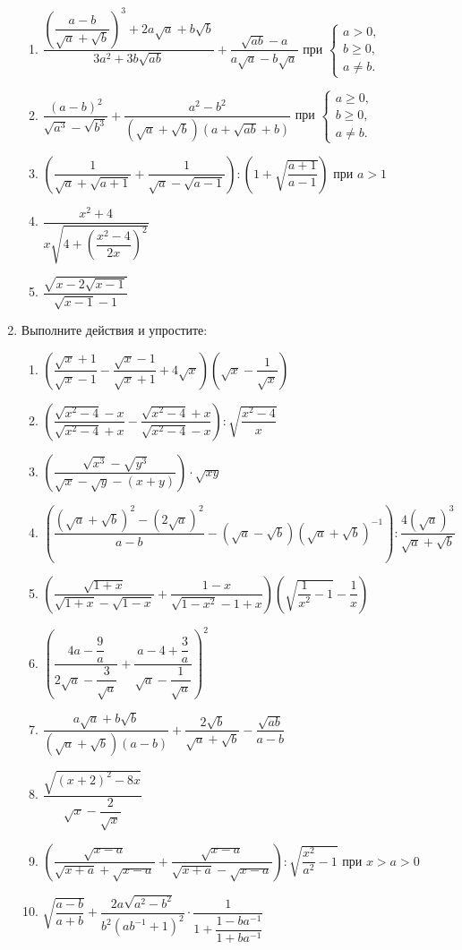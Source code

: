 \documentclass[12pt, a4paper]{article}
\begin{document}
\begin{enumerate}
\begin{enumerate}[label=\textbf{\arabic*)}]
		\item \( \dfrac{\left( \dfrac{a-b}{\sqrt{a}+\sqrt{b}} \right)^3+2a\sqrt{a}+b\sqrt{b}}{3a^2+3b\sqrt{ab}}+\dfrac{\sqrt{ab}-a}{a\sqrt{a}-b\sqrt{a}} \) при
		\( \left\{
		\begin{array}{l}
			a>0,\\
			b \geqslant0,\\
			a \neq b.
		\end{array}
		\right. \)
		\item \( \dfrac{(a-b)^2}{\sqrt{a^3}-\sqrt{b^3}}+\dfrac{a^2-b^2}{(\sqrt{a}+\sqrt{b})(a+\sqrt{ab}+b)} \) при
		\( \left\{
		\begin{array}{l}
			a\geqslant0,\\
			b \geqslant0,\\
			a \neq b.
		\end{array}
		\right. \)
		\item \( \left( \dfrac{1}{\sqrt{a}+\sqrt{a+1}}+\dfrac{1}{\sqrt{a}-\sqrt{a-1}} \right):\left( 1+\sqrt{\dfrac{a+1}{a-1}} \right) \) при \( a>1 \)
		\item \( \dfrac{x^2+4}{x\sqrt{4+\left( \dfrac{x^2-4}{2x} \right)^2}} \)
		\item \( \dfrac{\sqrt{x-2\sqrt{x-1}}}{\sqrt{x-1}-1} \)
		\end{enumerate}
	\item Выполните действия и упростите:
		\begin{enumerate}[label=\textbf{\arabic*)}]
			\item \( \left( \dfrac{\sqrt{x}+1}{\sqrt{x}-1}-\dfrac{\sqrt{x}-1}{\sqrt{x}+1}+4\sqrt{x} \right)\left( \sqrt{x}-\dfrac{1}{\sqrt{x}} \right) \)
			\item \( \left( \dfrac{\sqrt{x^2-4}-x}{\sqrt{x^2-4}+x}-\dfrac{\sqrt{x^2-4}+x}{\sqrt{x^2-4}-x} \right) :\sqrt{\dfrac{x^2-4}{x}}\)
			\item \( \left( \dfrac{\sqrt{x^3}-\sqrt{y^3}}{\sqrt{x}-\sqrt{y}-(x+y)} \right)\cdot\sqrt{xy} \)
			\item \( \left( \dfrac{(\sqrt{a}+\sqrt{b})^2-(2\sqrt{a})^2}{a-b}-(\sqrt{a}-\sqrt{b})(\sqrt{a}+\sqrt{b})^{-1} \right) :\dfrac{4(\sqrt{a})^3}{\sqrt{a}+\sqrt{b}}\)
			\item \( \left( \dfrac{\sqrt{1+x}}{\sqrt{1+x}-\sqrt{1-x}}+\dfrac{1-x}{\sqrt{1-x^2}-1+x} \right) \left( \sqrt{\dfrac{1}{x^2}-1}-\dfrac{1}{x} \right)\)
			\item \( \left( \dfrac{4a-\dfrac{9}{a}}{2\sqrt{a}-\dfrac{3}{\sqrt{a}}}+\dfrac{a-4+\dfrac{3}{a}}{\sqrt{a}-\dfrac{1}{\sqrt{a}}} \right)^2 \)
			\item \( \dfrac{a\sqrt{a}+b\sqrt{b}}{(\sqrt{a}+\sqrt{b})(a-b)}+\dfrac{2\sqrt{b}}{\sqrt{a}+\sqrt{b}}-\dfrac{\sqrt{ab}}{a-b} \)
			\item \( \dfrac{\sqrt{(x+2)^2-8x}}{\sqrt{x}-\dfrac{2}{\sqrt{x}}} \)
			\item \( \left( \dfrac{\sqrt{x-a}}{\sqrt{x+a}+\sqrt{x-a}}+\dfrac{\sqrt{x-a}}{\sqrt{x+a}-\sqrt{x-a}} \right):\sqrt{\dfrac{x^2}{a^2}-1} \) при \( x>a>0 \)
			\item \( \sqrt{\dfrac{a-b}{a+b}}+\dfrac{2a\sqrt{a^2-b^2}}{b^2(ab^{-1}+1)^2}\cdot\dfrac{1}{1+\dfrac{1-ba^{-1}}{1+ba^{-1}}} \)
		\end{enumerate}
\end{enumerate}
\end{document}
